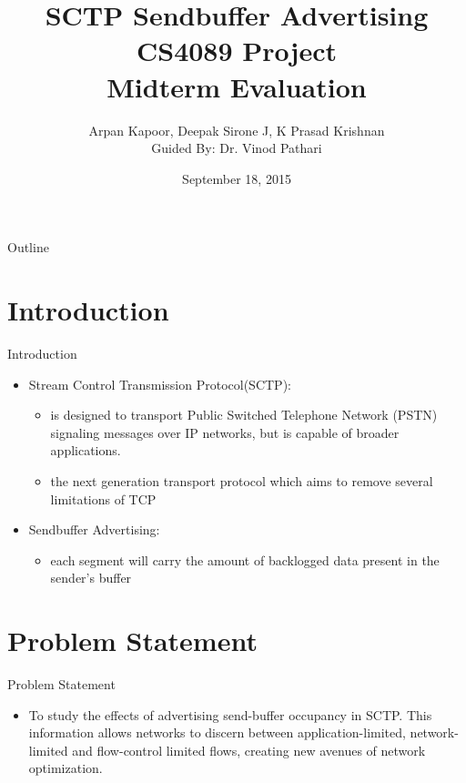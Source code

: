 \documentclass{beamer}
\title{SCTP Sendbuffer Advertising\\ {\normalsize CS4089 Project\\Midterm Evaluation}}
\author{Arpan Kapoor, Deepak Sirone J, K Prasad Krishnan\\Guided By: Dr. Vinod Pathari}
\date{September 18, 2015}
\begin{document}
\begin{frame}
  \titlepage
\end{frame}

\begin{frame}{Outline}
  \tableofcontents
\end{frame}
\section{Introduction}
\begin{frame}{Introduction}
\begin{itemize}
 \item Stream Control Transmission Protocol(SCTP):
\begin{itemize}
 \item is designed to transport Public Switched Telephone Network (PSTN) signaling messages
   over IP networks, but is capable of broader applications.
\end{itemize}
\begin{itemize}
 \item the next generation transport protocol which aims to remove several limitations of TCP
\end{itemize}
\end{itemize}
\begin{itemize}
 \item Sendbuffer Advertising:
\begin{itemize}
 \item each segment will carry the amount of backlogged data present in the sender's
   buffer   
\end{itemize}
\end{itemize}

\end{frame}

\section{Problem Statement}
\begin{frame}{Problem Statement}
\begin{itemize}
 \item To study the effects of advertising send-buffer occupancy in SCTP. 
This information allows networks to discern between application-limited, network-limited and flow-control limited flows, creating new avenues of network optimization.
\end{itemize}
\end{frame}
\end{document}
